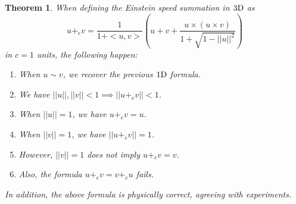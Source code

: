 \documentclass[12pt]{amsbook}
\newtheorem{theorem}{Theorem}[chapter]
\begin{document}
\begin{theorem}
When defining the Einstein speed summation in $3{\rm D}$ as 
$$u+_ev=\frac{1}{1+<u,v>}\left(u+v+\frac{u\times(u\times v)}{1+\sqrt{1-||u||^2}}\right)$$
in $c=1$ units, the following happen:
\begin{enumerate}
\item When $u\sim v$, we recover the previous $1{\rm D}$ formula.

\item We have $||u||,||v||<1\implies||u+_ev||<1$.

\item When $||u||=1$, we have $u+_ev=u$.

\item When $||v||=1$, we have $||u+_ev||=1$.

\item However, $||v||=1$ does not imply $u+_ev=v$.

\item Also, the formula $u+_ev=v+_eu$ fails.
\end{enumerate}
In addition, the above formula is physically correct, agreeing with experiments.
\end{theorem}
\end{document}

